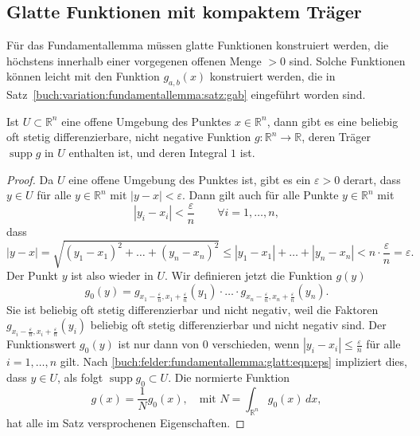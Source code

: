%
%
%

%
%
\subsection{Glatte Funktionen mit kompaktem Träger}
Für das Fundamentallemma müssen glatte Funktionen konstruiert werden, die
höchstens innerhalb einer vorgegenen offenen Menge $>0$ sind.
Solche Funktionen können leicht mit den Funktion $g_{a,b}(x)$
konstruiert werden, die in Satz~\ref{buch:variation:fundamentallemma:satz:gab}
eingeführt worden sind.

\begin{satz}
\label{buch:felder:fundamentallemma:glatt:satz:glatt}
Ist $U\subset \mathbb{R}^n$ eine offene Umgebung des Punktes
$x\in\mathbb{R}^n$, dann gibt es eine beliebig oft stetig
differenzierbare, nicht negative Funktion $g\colon \mathbb{R}^n\to\mathbb{R}$,
deren Träger $\operatorname{supp}g$ in $U$ enthalten ist,
und deren Integral $1$ ist.
\end{satz}

\begin{proof}
Da $U$ eine offene Umgebung des Punktes ist, gibt es ein $\varepsilon>0$
derart, dass $y\in U$ für alle $y\in\mathbb{R}^n$ mit $|y-x|<\varepsilon$.
Dann gilt auch für alle Punkte $y\in\mathbb{R}^n$ mit
\[
|y_i-x_i|< \frac{\varepsilon}{n}
\qquad
\forall i=1,\dots,n,
\]
dass 
\begin{equation}
|y-x|
=
\sqrt{
(y_1-x_1)^2
+
\dots
+
(y_n-x_n)^2
}
\le
|y_1-x_1|+\dots+|y_n-x_n|
<
n\cdot \frac{\varepsilon}n
=
\varepsilon.
\label{buch:felder:fundamentallemma:glatt:eqn:eps}
\end{equation}
Der Punkt $y$ ist also wieder in $U$.
Wir definieren jetzt die Funktion $g(y)$ 
\[
g_0(y)
=
g_{x_1-\frac{\varepsilon}n,x_1+\frac{\varepsilon}n}(y_1)
\cdot
\ldots
\cdot
g_{x_n-\frac{\varepsilon}n,x_n+\frac{\varepsilon}n}(y_n).
\]
Sie ist beliebig oft stetig differenzierbar und nicht negativ,
weil die Faktoren $g_{x_i-\frac{\varepsilon}n,x_i+\frac{\varepsilon}n}(y_i)$
beliebig oft stetig differenzierbar und nicht negativ sind.
Der Funktionswert $g_0(y)$ ist nur dann von $0$ verschieden, wenn
$|y_i-x_i|\le \frac{\varepsilon}n$ für alle $i=1,\dots,n$ gilt.
Nach
\eqref{buch:felder:fundamentallemma:glatt:eqn:eps}
impliziert dies, dass $y\in U$, als folgt
$\operatorname{supp}g_0\subset U$.
Die normierte Funktion
\[
g(x) = \frac{1}{N}g_0(x),\quad\text{mit }
N=\int_{\mathbb{R}^n} g_0(x)\,dx,
\]
hat alle im Satz versprochenen Eigenschaften.
\end{proof}





